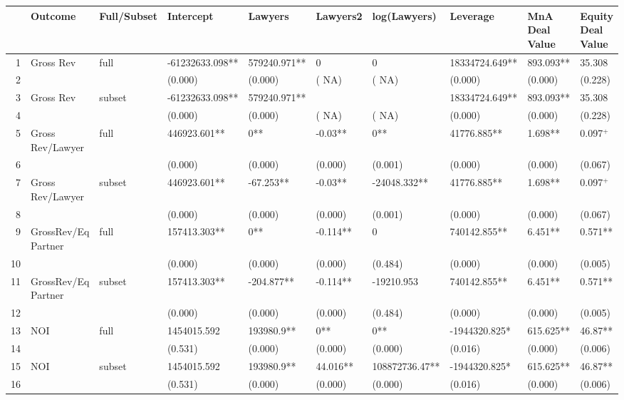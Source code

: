 \begin{table}[ht]
\centering
\begin{tabular}{rlllllllll}
  \hline
 & Outcome & Full/Subset & Intercept & Lawyers & Lawyers2 & log(Lawyers) & Leverage & MnA Deal Value & Equity Deal Value \\ 
  \hline
1 & Gross Rev & full & -61232633.098** & 579240.971** & 0 & 0 & 18334724.649** & 893.093** & 35.308 \\ 
  2 &  &  & (0.000) & (0.000) & (   NA) & (   NA) & (0.000) & (0.000) & (0.228) \\ 
  3 & Gross Rev & subset & -61232633.098** & 579240.971** &  &  & 18334724.649** & 893.093** & 35.308 \\ 
  4 &  &  & (0.000) & (0.000) & (   NA) & (   NA) & (0.000) & (0.000) & (0.228) \\ 
  5 & Gross Rev/Lawyer & full & 446923.601** & 0** & -0.03** & 0** & 41776.885** & 1.698** & 0.097$^{+}$ \\ 
  6 &  &  & (0.000) & (0.000) & (0.000) & (0.001) & (0.000) & (0.000) & (0.067) \\ 
  7 & Gross Rev/Lawyer & subset & 446923.601** & -67.253** & -0.03** & -24048.332** & 41776.885** & 1.698** & 0.097$^{+}$ \\ 
  8 &  &  & (0.000) & (0.000) & (0.000) & (0.001) & (0.000) & (0.000) & (0.067) \\ 
  9 & GrossRev/Eq Partner & full & 157413.303** & 0** & -0.114** & 0 & 740142.855** & 6.451** & 0.571** \\ 
  10 &  &  & (0.000) & (0.000) & (0.000) & (0.484) & (0.000) & (0.000) & (0.005) \\ 
  11 & GrossRev/Eq Partner & subset & 157413.303** & -204.877** & -0.114** & -19210.953 & 740142.855** & 6.451** & 0.571** \\ 
  12 &  &  & (0.000) & (0.000) & (0.000) & (0.484) & (0.000) & (0.000) & (0.005) \\ 
  13 & NOI & full & 1454015.592 & 193980.9** & 0** & 0** & -1944320.825* & 615.625** & 46.87** \\ 
  14 &  &  & (0.531) & (0.000) & (0.000) & (0.000) & (0.016) & (0.000) & (0.006) \\ 
  15 & NOI & subset & 1454015.592 & 193980.9** & 44.016** & 108872736.47** & -1944320.825* & 615.625** & 46.87** \\ 
  16 &  &  & (0.531) & (0.000) & (0.000) & (0.000) & (0.016) & (0.000) & (0.006) \\ 

\end{tabular}
\end{table}
